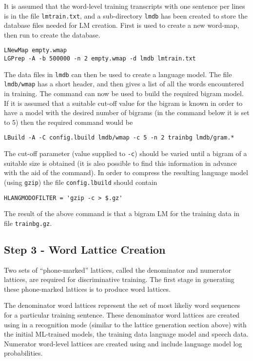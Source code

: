 It is assumed that the word-level training transcripts with one sentence per
lines is in the file \texttt{lmtrain.txt}, and a sub-directory \texttt{lmdb}
has been created to store the database files needed for LM creation. First
 is used to 
create a new word-map, then  run to create the database.

\begin{verbatim}
LNewMap empty.wmap
LGPrep -A -b 500000 -n 2 empty.wmap -d lmdb lmtrain.txt
\end{verbatim}

The data files in \texttt{lmdb} can then be used to create a language
model. The file \texttt{lmdb/wmap} has a short header, and then gives a list
of all the words encountered in training.
The  command can now be used to build the required bigram
model. If it is assumed that a suitable cut-off value for the bigram is known
in order to have a model with the desired number of bigrams (in the command
below it is set to 5) then the required  command would be
\begin{verbatim}
LBuild -A -C config.lbuild lmdb/wmap -c 5 -n 2 trainbg lmdb/gram.* 
\end{verbatim}
The cut-off parameter (value supplied to \texttt{-c}) should be varied until a
bigram of a suitable size is obtained (it is also possible to find this
information in advance with the aid of the  command). In order to
compress the resulting language model (using \texttt{gzip}) the file
\texttt{config.lbuild} should contain
\begin{verbatim}
HLANGMODOFILTER = 'gzip -c > $.gz'
\end{verbatim}
The result of the above command is that a bigram LM for the training data in file \texttt{trainbg.gz}.

\subsection{Step 3 - Word Lattice Creation} 
Two sets of ``phone-marked'' lattices, called the denominator and numerator lattices, are
required for discriminative training. The first stage in generating these
phone-marked lattices is to produce word lattices.

The denominator word lattices represent the set of most likeliy word sequences
for a particular training sentence.  These denominator word lattices are
created using  in a recognition mode (similar to the
 lattice generation section above) with the initial ML-trained
models, the training data language model and speech data. Numerator word-level
lattices are created using  and include language model log
probabilities.

